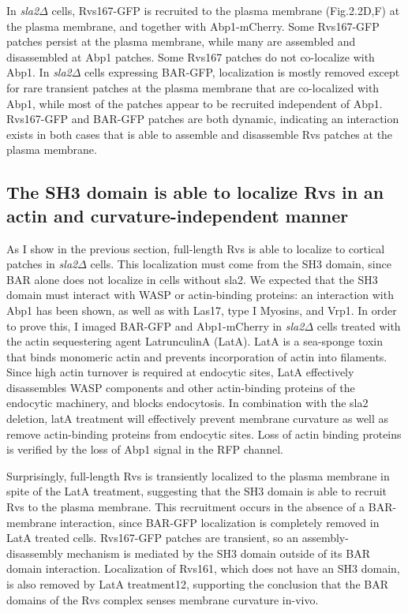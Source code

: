 	\vspace{5mm}
	In \textit{sla2$\Delta$} cells, Rvs167-GFP is recruited to the plasma membrane (Fig.2.2D,F) at the plasma membrane, and together with Abp1-mCherry. Some Rvs167-GFP patches persist at the plasma membrane, while many are assembled and disassembled at Abp1 patches. Some Rvs167 patches do not co-localize with Abp1. In \textit{sla2$\Delta$} cells expressing BAR-GFP, localization is mostly removed except for rare transient patches at the plasma membrane that are co-localized with Abp1, while most of the patches appear to be recruited independent of Abp1. Rvs167-GFP and BAR-GFP patches are both dynamic, indicating an interaction exists in both cases that is able to assemble and disassemble Rvs patches at the plasma membrane. 

	\subsection{The SH3 domain is able to localize Rvs in an actin and curvature-independent manner}

	As I show in the previous section, full-length Rvs is able to localize to cortical patches in \textit{sla2$\Delta$} cells. This localization must come from the SH3 domain, since BAR alone does not localize in cells without sla2. We expected that the SH3 domain must interact with WASP or actin-binding proteins: an interaction with Abp1 has been shown, as well as with Las17, type I Myosins, and Vrp1. In order to prove this, I imaged BAR-GFP and Abp1-mCherry in \textit{sla2$\Delta$} cells treated with the actin sequestering agent LatrunculinA (LatA). LatA is a sea-sponge toxin that binds monomeric actin and prevents incorporation of actin into filaments. Since high actin turnover is required at endocytic sites, LatA effectively disassembles WASP components and other actin-binding proteins of the endocytic machinery, and blocks endocytosis. In combination with the sla2 deletion, latA treatment will effectively prevent membrane curvature as well as remove actin-binding proteins from endocytic sites. Loss of actin binding proteins is verified by the loss of Abp1 signal in the RFP channel.


	\vspace{5mm}
Surprisingly, full-length Rvs is transiently localized to the plasma membrane in spite of the LatA treatment, suggesting that the SH3 domain is able to recruit Rvs to the plasma membrane. This recruitment occurs in the absence of a BAR-membrane interaction, since BAR-GFP localization is completely removed in LatA treated cells. Rvs167-GFP patches are transient, so an assembly-disassembly mechanism is mediated by the SH3 domain outside of its BAR domain interaction. Localization of Rvs161, which does not have an SH3 domain, is also removed by LatA treatment12, supporting the conclusion that the BAR domains of the Rvs complex senses membrane curvature in-vivo. 

